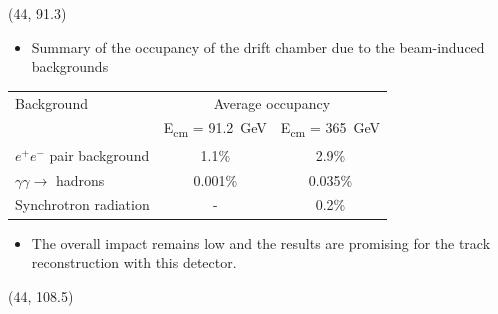 \documentclass[final,xcolor={dvipsnames,svgnames,x11names,table}]{beamer}
\begin{document}
\begin{frame}
\begin{textblock}{43}
\begin{tcolorbox}[title=Beam-induced backgrounds and the impact on the drift chamber]
\begin{columns}
  \end{columns}

  \end{tcolorbox}
\end{textblock}

 \begin{textblock}{39.5}(44, 91.3)
   \begin{tcolorbox}[title=Conclusions]

  \vspace{0.3cm}

   \begin{itemize}
     \item Summary of the occupancy of the drift chamber due to the beam-induced backgrounds \vspace{0.5cm}
   \end{itemize}
   \centering
   \begin{adjustbox}{max width=\textwidth}
     \begin{tabular}{l c c}
       \toprule
        Background & \multicolumn{2}{c}{Average occupancy} \\
         & E\textsubscript{cm} = 91.2~GeV &  E\textsubscript{cm} = 365~GeV \\
        \midrule
        $e^+e^-$ pair background & 1.1\% & 2.9\% \\
        $\gamma\gamma\rightarrow$ hadrons & 0.001\% & 0.035\%  \\
        Synchrotron radiation & - & 0.2\% \\
        \bottomrule
     \end{tabular}
   \end{adjustbox}

   \vspace{0.8cm}

   \begin{itemize}
    \item The overall impact remains low and the results are promising for the track reconstruction with this detector.
   \end{itemize}

   \vspace{0.5cm}

  \end{tcolorbox}
 \end{textblock}

 \begin{textblock}{39.5}(44, 108.5)
   \begin{tcolorbox}[title=References]

   \printbibliography

  \end{tcolorbox}
 \end{textblock}

\end{frame}
\end{document}
